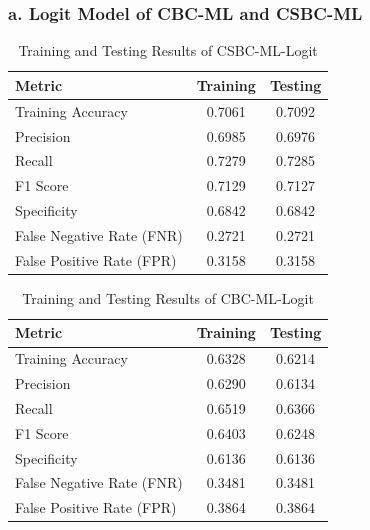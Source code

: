 \subsubsection*{a. Logit Model of CBC-ML and CSBC-ML}
\begin{table}[h]
\centering
\small
\renewcommand{\arraystretch}{1.2} %

\begin{tabular}{l c c}
\hline
\textbf{Metric} & \textbf{Training} & \textbf{Testing} \\
\hline
Training Accuracy & 0.7061 & 0.7092 \\
Precision         & 0.6985 & 0.6976 \\
Recall           & 0.7279 & 0.7285 \\
F1 Score         & 0.7129 & 0.7127 \\
Specificity      & 0.6842 & 0.6842 \\
False Negative Rate (FNR) & 0.2721 & 0.2721 \\
False Positive Rate (FPR) & 0.3158 & 0.3158 \\
\hline
\end{tabular}
\caption{Training and Testing Results of CSBC-ML-Logit}
\label{tab:train_test_CSBC_ML_log}
\end{table}


\begin{table}[h]
\centering
\small
\renewcommand{\arraystretch}{1.2} %

\begin{tabular}{l c c}
\hline
\textbf{Metric} & \textbf{Training} & \textbf{Testing} \\
\hline
Training Accuracy & 0.6328 & 0.6214 \\
Precision         & 0.6290 & 0.6134 \\
Recall           & 0.6519 & 0.6366 \\
F1 Score         & 0.6403 & 0.6248 \\
Specificity      & 0.6136 & 0.6136 \\
False Negative Rate (FNR) & 0.3481 & 0.3481 \\
False Positive Rate (FPR) & 0.3864 & 0.3864 \\
\hline
\end{tabular}

\caption{Training and Testing Results of CBC-ML-Logit}
\label{tab:train_test_CBC_ML_log}
\end{table}

